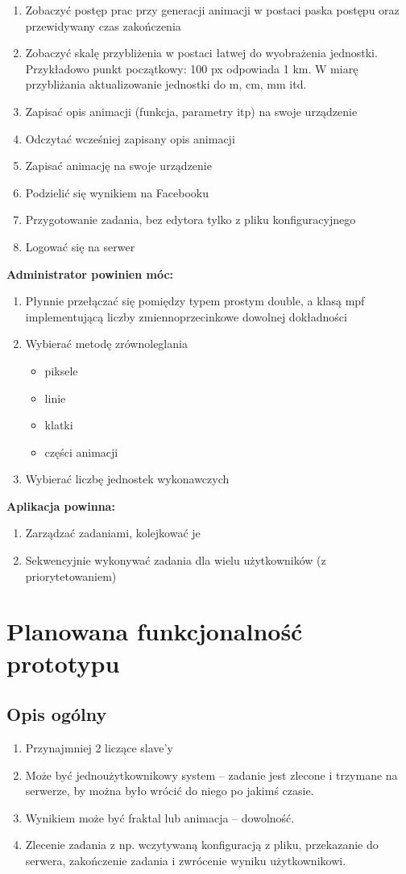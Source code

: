 \documentclass[a4paper]{article}
\begin{document}
\begin{enumerate}
\item Zobaczyć postęp prac przy generacji animacji w postaci paska postępu oraz przewidywany czas zakończenia 
\item Zobaczyć skalę przybliżenia w postaci łatwej do wyobrażenia jednostki. Przykładowo punkt początkowy: 100 px odpowiada 1 km. W miarę przybliżania aktualizowanie jednostki do m, cm, mm itd.
\item Zapisać opis animacji (funkcja, parametry itp) na swoje urządzenie
\item Odczytać wcześniej zapisany opis animacji
\item Zapisać animację na swoje urządzenie
\item Podzielić się wynikiem na Facebooku
\item Przygotowanie zadania, bez edytora tylko z pliku konfiguracyjnego
\item Logować się na serwer
\end{enumerate}
\textbf{Administrator powinien móc:}
\begin{enumerate}
\item Płynnie przełączać się pomiędzy typem prostym double, a klasą mpf implementującą liczby zmiennoprzecinkowe dowolnej dokładności
\item Wybierać metodę zrównoleglania 
\begin{itemize}
\item piksele
\item linie
\item klatki
\item części animacji
\end{itemize}
\item Wybierać liczbę jednostek wykonawczych
\end{enumerate}
\textbf{Aplikacja powinna:}
\begin{enumerate}
\item Zarządzać zadaniami, kolejkować je
\item Sekwencyjnie wykonywać zadania dla wielu użytkowników (z priorytetowaniem)
\end{enumerate}

\newpage

\section{Planowana funkcjonalność prototypu}
\subsection{Opis ogólny}
\begin{enumerate}
\item Przynajmniej 2 liczące slave'y
\item Może być jednoużytkownikowy system -- zadanie jest zlecone i trzymane na serwerze, by można było wrócić do niego po jakimś czasie.
\item Wynikiem może być fraktal lub animacja -- dowolność.
\item Zlecenie zadania z np. wczytywaną konfiguracją z pliku, przekazanie do serwera, zakończenie zadania i zwrócenie wyniku użytkownikowi.
\end{enumerate}
\end{document}
